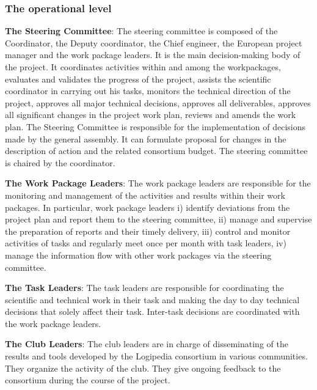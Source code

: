 \subsubsection*{The operational level}

\begin{compactitem}
\item{\bf The Steering Committee}:
The steering committee is composed of the Coordinator, the Deputy
coordinator, the Chief engineer, the European project manager and the
work package leaders.  It is the main decision-making body of the
project. It coordinates activities within and among the workpackages,
evaluates and validates the progress of the project, assists the
scientific coordinator in carrying out his tasks, monitors the
technical direction of the project, approves all major technical
decisions, approves all deliverables, approves all significant changes
in the project work plan, reviews and amends the work plan. The
Steering Committee is responsible for the implementation of decisions
made by the general assembly. It can formulate proposal for changes in
the description of action and the related consortium budget. The
steering committee is chaired by the coordinator.

\item{\bf The Work Package Leaders}: The work package leaders are
responsible for the monitoring and management of the activities and
results within their work packages. In particular, work package
leaders i) identify deviations from the project plan and report them
to the steering committee, ii) manage and supervise the preparation of
reports and their timely delivery, iii) control and monitor activities
of tasks and regularly meet once per month with task leaders, iv)
manage the information flow with other work packages via the steering
committee.

\item{\bf The Task Leaders}: The task leaders are responsible for
coordinating the scientific and technical work in their task and
making the day to day technical decisions that solely affect their
task. Inter-task decisions are coordinated with the work package
leaders.

\item{\bf The Club Leaders}: The club leaders are in charge of
  disseminating of the results and tools developed by the Logipedia
  consortium in various communities. They organize the activity of the
  club. They give ongoing feedback to the consortium during the course
  of the project.
\end{compactitem}

